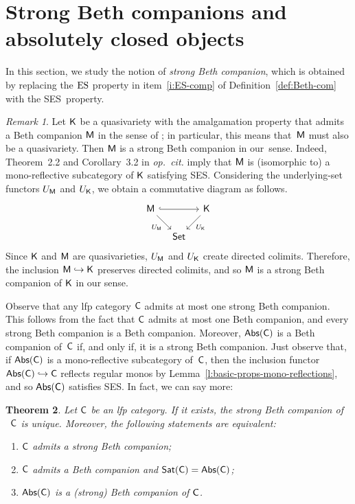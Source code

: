 \documentclass[a4paper,10pt,reqno]{amsart}
\newtheorem{theorem}{Theorem}[section]
\theoremstyle{definition}
\theoremstyle{remark}
\newtheorem{remark}[theorem]{Remark}
\newcommand{\cat}{{\sf C}}								%
\newcommand{\Set}{{\sf Set}}								%
\newcommand{\Sat}{{\sf Sat}}								%
\newcommand{\Abs}{{\sf Abs}}								%
\newcommand{\K}{{\sf K}}									%
\newcommand{\M}{{\sf M}}								%
\newcommand{\into}{\hookrightarrow}						%
\newcommand{\ES}{\textnormal{ES}}
\newcommand{\SES}{\textnormal{SES}}
\begin{document}
\section{Strong Beth companions and absolutely closed objects}\label{s:strong-Beth-sbs-closed}

In this section, we study the notion of \emph{strong Beth companion}, which is obtained by replacing the $\ES$ property in item~\ref{i:ES-comp} of Definition~\ref{def:Beth-com} with the \SES~property. 

\begin{remark}\label{rmk:comparison-Beth-companions}
Let $\K$ be a quasivariety with the amalgamation property that admits a Beth companion $\M$ in the sense of \cite{CKM2026bis}; in particular, this means that~$\M$ must also be a quasivariety. Then $\M$ is a strong Beth companion in our~sense. Indeed, Theorem~2.2 and Corollary~3.2 in \emph{op.~cit.} imply that $\M$ is (isomorphic to) a mono-reflective subcategory of $\K$ satisfying \SES. Considering the underlying-set functors $U_{\M}$ and $U_{\K}$, we obtain a commutative diagram as follows.
\[\begin{tikzcd}[column sep=1em, row sep=1.5em]
\M \arrow[hookrightarrow]{rr} \arrow{dr}[swap]{U_{\M}} & & \K \arrow{dl}{U_{\K}} \\
& \Set &
\end{tikzcd}\]
Since $\K$ and $\M$ are quasivarieties, $U_{\M}$ and $U_{\K}$ create directed colimits. Therefore, the inclusion $\M\into \K$ preserves directed colimits, and so $\M$ is a strong Beth companion of $\K$ in our sense.
\end{remark}


Observe that any lfp category $\cat$ admits at most one strong Beth companion. This follows from the fact that $\cat$ admits at most one Beth companion, and every strong Beth companion is a Beth companion. 
%
Moreover, $\Abs(\cat)$ is a Beth companion of~$\cat$ if, and only if, it is a strong Beth companion. Just observe that, if $\Abs(\cat)$ is a mono-reflective subcategory of~$\cat$, then the inclusion functor $\Abs(\cat)\into \cat$ reflects regular monos by Lemma~\ref{l:basic-props-mono-reflections}, and so $\Abs(\cat)$ satisfies \SES.
%
In fact, we can say more:

\begin{theorem}\label{t:strong-Beth-companion-unique}
Let $\cat$ be an lfp category. If it exists, the strong Beth companion of ~$\cat$ is unique. Moreover, the following statements are equivalent:
\begin{enumerate}[label=(\arabic*)]
\item\label{i:has-strong-Beth-comp} $\cat$ admits a strong Beth companion;
\item\label{i:beth-comp-exists-and-sat-equal-abs} $\cat$ admits a Beth companion and $\Sat(\cat)=\Abs(\cat)$;
\item\label{i:abs-is-strong-beth-comp} $\Abs(\cat)$ is a (strong) Beth companion of $\cat$. 
\end{enumerate}
\end{theorem}
\end{document}
